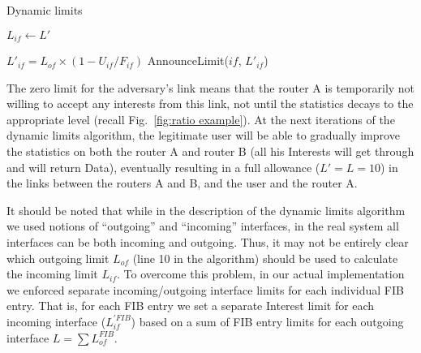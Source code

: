 \begin{algorithm}[h]
\caption{Dynamic limits}
\label{alg:dynamic limits}
\begin{algorithmic}[1]
\State{} 
\vspace{0.2cm}
  

\vspace{0.2cm}

\State{} 
    \State $L_{if} \leftarrow L'$
\EndFunction

\vspace{0.2cm}

 

        \State $L'_{if}= {L_{of}} \times (1 - U_{if}/F_{if})$
        \State AnnounceLimit($if$, $L'_{if}$)
   \EndFor

\EndFor
\EndFunction

\end{algorithmic}
\end{algorithm}

The zero limit for the adversary's link means that the router A is temporarily not willing to accept any interests from this link, not until the statistics decays to the appropriate level (recall Fig.~\ref{fig:ratio example}).
At the next iterations of the dynamic limits algorithm, the legitimate user will be able to gradually improve the statistics on both the router A and router B (all his Interests will get through and will return Data), eventually resulting in a full allowance ($L'=L=10$) in the links between the routers A and B, and the user and the router A.

It should be noted that while in the description of the dynamic limits algorithm we used notions of ``outgoing'' and ``incoming'' interfaces, in the real system all interfaces can be both incoming and outgoing.
Thus, it may not be entirely clear which outgoing limit $L_{of}$ (line 10 in the algorithm) should be used to calculate the incoming limit $L_{if}$.
To overcome this problem, in our actual implementation we enforced separate incoming/outgoing interface limits for each individual FIB entry.
That is, for each FIB entry we set a separate Interest limit for each incoming interface ($L_{if}^{'FIB}$) based on a sum of FIB entry limits for each outgoing interface $L=\sum{L_{of}^{FIB}}$.


